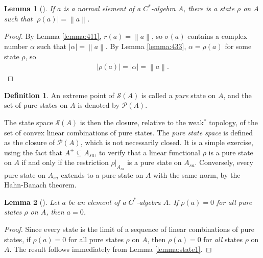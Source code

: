 \documentclass[11pt,a4paper]{report}
\theoremstyle{plain}
\newtheorem{lemma}{Lemma}
\theoremstyle{definition}
\newtheorem{defn}{Definition}
\newcommand{\1}{\mathbbm{1}}
\renewcommand{\S}{\mathscr{S}}
\renewcommand{\P}[1]{\mathscr{P}(#1)}
\newcommand{\spec}[1]{\sigma(#1)}
\begin{document}
\begin{lemma}[{\cite[4.3.4,(iv)]{kadison83}}]\label{lemma:state2}
	If $a$ is a normal element of a $C^\ast$-algebra $A$, there is a state $\rho$ 
	on $A$ such that $|\rho(a)|=\left\|a\right\|$.
\end{lemma}
\begin{proof}
	By Lemma \ref{lemma:411}, $r(a)=\left\|a\right\|$, so $\spec a$ contains a 
	complex number $\alpha$ such that $|\alpha|=\left\|a\right\|$. By Lemma 
	\ref{lemma:433}, $\alpha=\rho(a)$ for some state $\rho$, so 
	\begin{align*}
		|\rho(a)|=|\alpha|=\left\|a\right\|.
	\end{align*}
\end{proof}

\begin{defn}
	An extreme point of $\S(A)$ is called a \emph{pure} state on $A$, and the set 
	of pure states on $A$ is denoted by $\P{A}$.
\end{defn}
The state space $\S(A)$ is then the closure, relative to the weak$^\ast$ 
topology, of the set of convex linear combinations of pure states.
The \emph{pure state space} is defined as the closure of $\P A$, which is not 
necessarily closed.
It is a simple exercise, using the fact that $A^+\subseteq A_{sa}$, to verify 
that a linear functional $\rho$ is a pure state on $A$ if and only if the 
restriction $\rho|_{A_{sa}}$ is a pure state on $A_{sa}$.
Conversely, every pure state on $A_{sa}$ extends to a pure state on $A$ with the 
same norm, by the Hahn-Banach theorem.
 

\begin{lemma}[{\cite[4.3.8,(i)]{kadison83}}]\label{lemma:pure1}
	Let $a$ be an element of a $C^\ast$-algebra $A$. If $\rho(a)=0$ for all 
	\emph{pure} states $\rho$ on $A$, then $a=0$.
\end{lemma}
\begin{proof}
	Since every state is the limit of a sequence of linear combinations of pure 
	states, if $\rho(a)=0$ for all pure states $\rho$ on $A$, then $\rho(a)=0$ for 
	\emph{all} states $\rho$ on $A$. The result follows immediately from Lemma 
	\ref{lemma:state1}.
\end{proof}
\end{document}
